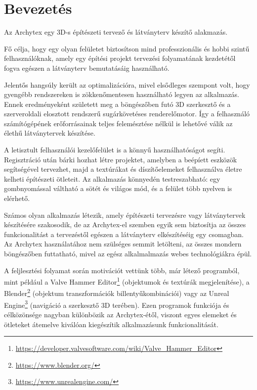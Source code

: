 \part{Bevezetés}

Az Archytex egy 3D-s építészeti tervező és látványterv készítő alakmazás.

Fő célja, hogy egy olyan felületet biztosítson mind professzionális és hobbi szintű felhasználóknak, amely egy építési projekt tervezési folyamatának kezdetétől fogva egészen a látványterv bemutatásáig használható.

Jelentős hangsúly került az optimalizációra, mivel elsődleges szempont volt, hogy gyengébb rendszereken is zökkenőmentesen használható legyen az alkalmazás. Ennek eredményeként született meg a böngészőben futó 3D szerkesztő és a szerveroldali elosztott rendszerű sugárkövetéses renderelőmotor. Így a felhasználó számítógépének erőforrásainak teljes felemésztése nélkül is lehetővé válik az élethű látványtervek készítése.

A letisztult felhasználói kezelőfelület is a könnyű használhatóságot segíti. Regisztráció után bárki hozhat létre projektet, amelyben a beépíett eszközök segítségével tervezhet, majd a textúrákat és díszítőelemeket felhasználva életre kelheti építészeti ötleteit. Az alkalmazás könnyedén testreszabható: egy gombnyomással váltható a sötét és világos mód, és a felület több nyelven is elérhető.

Számos olyan alkalmazás létezik, amely építészeti tervezésre vagy látványtervek készítésére szakosodik, de az Archytex-el szemben egyik sem biztosítja az összes funkcionalitást a tervezéstől egészen a látványterv elkészítéséig egy csomagban. Az Archytex használatához nem szülséges semmit letölteni, az összes mondern böngészőben futtatható, mivel az egész alkalmalmazás webes technológiákra épül.

A feljlesztési folyamat során motivációt vettünk több, már létező programból, mint például a Valve Hammer Editor\footnote{\url{https://developer.valvesoftware.com/wiki/Valve\_Hammer\_Editor}} (objektumok és textúrák megjelenítése), a Blender\footnote{\url{https://www.blender.org/}} (objektum transzformációk billentyűkombinációi) vagy az Unreal Engine\footnote{\url{https://www.unrealengine.com/}} (navigáció a szerkesztő 3D terében). Ezen programok funkciója és célközönsége nagyban különbözik az Archytex-étől, viszont egyes elemeket és ötleteket átemelve kiválóan kiegészítik alkalmazásunk funkcionalitását.